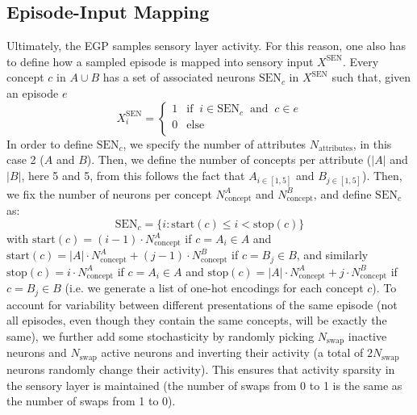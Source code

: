 \documentclass{article}
\begin{document}
\subsection*{Episode-Input Mapping}
Ultimately, the EGP samples sensory layer activity. For this reason, one also has to define how a sampled episode is mapped into sensory input $X^\textrm{SEN}$. Every concept $c$ in $A\cup B$ has a set of associated neurons $\textrm{SEN}_{c}$ in $X^\textrm{SEN}$ such that, given an episode $e$
\begin{equation}
     X^\textrm{SEN}_{i} = \begin{cases} 
      1 & \textrm{if} \;\; i \in \textrm{SEN}_{c} \;\;\textrm{and}\;\; c \in e\\ 
      0 & \textrm{else} \\
   \end{cases}
\end{equation}
In order to define $\textrm{SEN}_c$, we specify the number of attributes $N_\textrm{attributes}$, in this case 2 ($A$ and $B$). Then, we define the number of concepts per attribute ($|A|$ and $|B|$, here 5 and 5, from this follows the fact that $A_{i \in [1, 5]}$ and $B_{j \in [1, 5]}$). Then, we fix the number of neurons per concept $N_\textrm{concept}^A$ and $N_\textrm{concept}^B$, and define $\textrm{SEN}_{c}$ as:
\begin{equation}
    \textrm{SEN}_{c} = \{i : \textrm{start}(c) \leq i < \textrm{stop}(c)\}
\end{equation}
with $\textrm{start}(c) = (i - 1) \cdot N_\textrm{concept}^A$ if $c = A_i \in A$ and $\textrm{start}(c) =|A|\cdot N_\textrm{concept}^A + (j - 1) \cdot N_\textrm{concept}^B$ if $c = B_j \in B$, and similarly $\textrm{stop}(c) = i \cdot N_\textrm{concept}^A$ if $c = A_i \in A$ and $\textrm{stop}(c) =|A|\cdot N_\textrm{concept}^A + j \cdot N_\textrm{concept}^B$ if $c = B_j \in B$ (i.e. we generate a list of one-hot encodings for each concept $c$).
\newline\newline
To account for variability between different presentations of the same episode (not all episodes, even though they contain the same concepts, will be exactly the same), we further add some stochasticity by randomly picking $N_\textrm{swap}$ inactive neurons and $N_\textrm{swap}$ active neurons and inverting their activity (a total of $2N_\textrm{swap}$ neurons randomly change their activity). This ensures that activity sparsity in the sensory layer is maintained (the number of swaps from 0 to 1 is the same as the number of swaps from 1 to 0).
\end{document}
